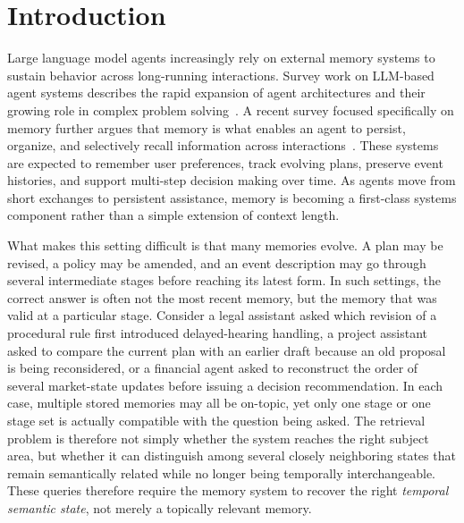 \section{Introduction}

Large language model agents increasingly rely on external memory systems to sustain behavior across long-running interactions. Survey work on LLM-based agent systems describes the rapid expansion of agent architectures and their growing role in complex problem solving~\cite{guo2024multiagents_survey}. A recent survey focused specifically on memory further argues that memory is what enables an agent to persist, organize, and selectively recall information across interactions~\cite{du2026memory_agents_survey}. These systems are expected to remember user preferences, track evolving plans, preserve event histories, and support multi-step decision making over time. As agents move from short exchanges to persistent assistance, memory is becoming a first-class systems component rather than a simple extension of context length.

What makes this setting difficult is that many memories evolve. A plan may be revised, a policy may be amended, and an event description may go through several intermediate stages before reaching its latest form. In such settings, the correct answer is often not the most recent memory, but the memory that was valid at a particular stage. Consider a legal assistant asked which revision of a procedural rule first introduced delayed-hearing handling, a project assistant asked to compare the current plan with an earlier draft because an old proposal is being reconsidered, or a financial agent asked to reconstruct the order of several market-state updates before issuing a decision recommendation. In each case, multiple stored memories may all be on-topic, yet only one stage or one stage set is actually compatible with the question being asked. The retrieval problem is therefore not simply whether the system reaches the right subject area, but whether it can distinguish among several closely neighboring states that remain semantically related while no longer being temporally interchangeable. These queries therefore require the memory system to recover the right \emph{temporal semantic state}, not merely a topically relevant memory.

